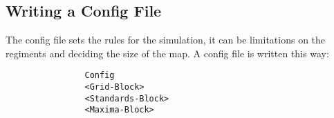 	\subsection{Writing a Config File}
		The config file sets the rules for the simulation, it can be limitations on the regiments and deciding the size of the map.
		A config file is written this way: \\
			\begin{verbatim}
				Config
				<Grid-Block>
				<Standards-Block>
				<Maxima-Block>
			\end{verbatim}
		
